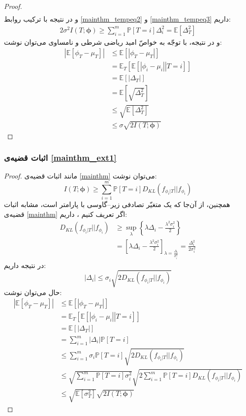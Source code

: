 \documentclass[a4paper,12pt]{article}
\newcommand{\E}{\mathbb{E}}
\newcommand{\Prob}{\mathbb{P}}
\newcommand{\bfphi}{\bm {\phi}}
\begin{document}
\begin{proof}
\begin{align}
		\end{align}
		و در نتیجه با ترکیب روابط
		\eqref{mainthm_tempeq2}
		و
		\eqref{mainthm_tempeq3}
		داریم:
		\begin{align}
		2\sigma^2 I(T;\bm{\phi}) \geq \sum_{i = 1}^{m} \Prob[T=i]\Delta_i^2 = \E[\Delta_T^2]
		\end{align}
		و در نتیجه، با توجّه به خواصّ امید ریاضی شرطی و نامساوی
		می‌توان نوشت:
		\begin{align}
		|\E[\phi_T-\mu_T]| &\leq \E[|\phi_T-\mu_T|]\\
		&= \E_T[\E[\left.|\phi_i-\mu_i|\right|T=i]] \\
		&=\E[|\Delta_T|]\\
		&= \E\left[\sqrt{\Delta_T^2}\right]\\
		&\leq \sqrt{\E[\Delta_T^2]}\\
		&\leq \sigma \sqrt{2I(T;\bm{\phi}) }
		\end{align}
	\end{proof}
	\subsubsection{اثبات قضیه‌ی
		\eqref{mainthm_ext1}}
	\begin{proof}
		مانند اثبات قضیه‌ی
		\eqref{mainthm}
		می‌توان نوشت:
		\begin{equation}
		I(T;\bfphi)\geq \sum_{i = 1}^{m} \Prob[T=i] D_{KL}(f_{\phi_i|T}||f_{\phi_i})
		\end{equation}
		همچنین، از آن‌جا که 
		یک متغیّر تصادفی زیر--گاوسی با پارامتر
		است، مشابه اثبات قضیه‌ی
		\eqref{mainthm}
		اگر تعریف کنیم
		\lr{$\Delta_i = \E[\phi_i|T=i]-\mu_i$}،
		داریم:
		\begin{align}
		D_{KL}(f_{\phi_i|T}||f_{\phi_i})&\geq \sup_{\lambda}\left\{\lambda\Delta_i-\frac{\lambda^2\sigma_i^2}{2}\right\}\\
		&= \left[\lambda\Delta_i-\frac{\lambda^2\sigma_i^2}{2}\right]_{\lambda=\frac{\Delta_i}{\sigma_i^2}} = \frac{\Delta_i^2}{2\sigma_i^2}
		\end{align}
		در نتیجه داریم:
		\begin{equation}
		|\Delta_i|\leq\sigma_i\sqrt{2D_{KL}(f_{\phi_i|T}||f_{\phi_i})}
		\end{equation}
		حال می‌توان نوشت:
		\begin{align}
		|\E[\phi_T-\mu_T]|&\leq\E[|\phi_T-\mu_T|]\\
		&= \E_T[\E[\left.|\phi_i-\mu_i|\right|T=i]]\\
		&= \E[|\Delta_T|]\\
		&= \sum_{i = 1}^{m} |\Delta_i|\Prob[T=i]\\
		&\leq \sum_{i = 1}^{m} \sigma_i \Prob[T=i] \sqrt{2D_{KL}(f_{\phi_i|T}||f_{\phi_i})}\\
		&\leq \sqrt{\sum\nolimits_{i = 1}^{m}\Prob[T=i]\sigma_i^2}\sqrt{2\sum\nolimits_{i = 1}^{m}\Prob[T=i]D_{KL}(f_{\phi_i|T}||f_{\phi_i})}\\
		&\leq \sqrt{\E[\sigma_T^2]} \sqrt{2I(T;\bfphi)}
		\end{align}
	\end{proof}
\end{document}
